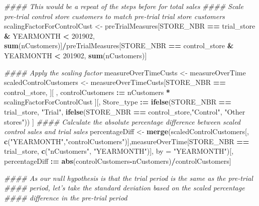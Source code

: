 \documentclass[
]{article}
\newenvironment{Shaded}{\begin{snugshade}}{\end{snugshade}}
\newcommand{\CommentTok}[1]{\textcolor[rgb]{0.56,0.35,0.01}{\textit{#1}}}
\newcommand{\DataTypeTok}[1]{\textcolor[rgb]{0.13,0.29,0.53}{#1}}
\newcommand{\DecValTok}[1]{\textcolor[rgb]{0.00,0.00,0.81}{#1}}
\newcommand{\ErrorTok}[1]{\textcolor[rgb]{0.64,0.00,0.00}{\textbf{#1}}}
\newcommand{\KeywordTok}[1]{\textcolor[rgb]{0.13,0.29,0.53}{\textbf{#1}}}
\newcommand{\NormalTok}[1]{#1}
\newcommand{\OperatorTok}[1]{\textcolor[rgb]{0.81,0.36,0.00}{\textbf{#1}}}
\newcommand{\StringTok}[1]{\textcolor[rgb]{0.31,0.60,0.02}{#1}}
\begin{document}
\begin{Shaded}
\begin{Highlighting}[]
\CommentTok{#### This would be a repeat of the steps before for total sales}
\CommentTok{#### Scale pre-trial control store customers to match pre-trial trial store customers}
\NormalTok{scalingFactorForControlCust <-}\StringTok{ }\NormalTok{preTrialMeasures[STORE_NBR }\OperatorTok{==}\StringTok{ }\NormalTok{trial_store }\OperatorTok{&}
\NormalTok{YEARMONTH }\OperatorTok{<}\StringTok{ }\DecValTok{201902}\NormalTok{, }\KeywordTok{sum}\NormalTok{(nCustomers)]}\OperatorTok{/}\NormalTok{preTrialMeasures[STORE_NBR }\OperatorTok{==}
\NormalTok{control_store }\OperatorTok{&}\StringTok{ }\NormalTok{YEARMONTH }\OperatorTok{<}\StringTok{ }\DecValTok{201902}\NormalTok{, }\KeywordTok{sum}\NormalTok{(nCustomers)]}

\CommentTok{#### Apply the scaling factor}
\NormalTok{measureOverTimeCusts <-}\StringTok{ }\NormalTok{measureOverTime}
\NormalTok{scaledControlCustomers <-}\StringTok{ }\NormalTok{measureOverTimeCusts[STORE_NBR }\OperatorTok{==}\StringTok{ }\NormalTok{control_store,}
\NormalTok{][ , controlCustomers }\OperatorTok{:}\ErrorTok{=}\StringTok{ }\NormalTok{nCustomers }\OperatorTok{*}\StringTok{ }\NormalTok{scalingFactorForControlCust}
\NormalTok{][, Store_type }\OperatorTok{:}\ErrorTok{=}\StringTok{ }\KeywordTok{ifelse}\NormalTok{(STORE_NBR }\OperatorTok{==}\StringTok{ }\NormalTok{trial_store, }\StringTok{"Trial"}\NormalTok{,}
\KeywordTok{ifelse}\NormalTok{(STORE_NBR }\OperatorTok{==}\StringTok{ }\NormalTok{control_store,}\StringTok{"Control"}\NormalTok{, }\StringTok{"Other stores"}\NormalTok{))}
\NormalTok{]}
\CommentTok{#### Calculate the absolute percentage difference between scaled control sales and trial sales}
\NormalTok{percentageDiff <-}\StringTok{ }\KeywordTok{merge}\NormalTok{(scaledControlCustomers[, }\KeywordTok{c}\NormalTok{(}\StringTok{"YEARMONTH"}\NormalTok{,}\StringTok{"controlCustomers"}\NormalTok{)],measureOverTime[STORE_NBR }\OperatorTok{==}\StringTok{ }\NormalTok{trial_store, }\KeywordTok{c}\NormalTok{(}\StringTok{"nCustomers"}\NormalTok{, }\StringTok{"YEARMONTH"}\NormalTok{)],}
\DataTypeTok{by =} \StringTok{"YEARMONTH"}\NormalTok{)[, percentageDiff }\OperatorTok{:}\ErrorTok{=}\StringTok{ }\KeywordTok{abs}\NormalTok{(controlCustomers}\OperatorTok{-}\NormalTok{nCustomers)}\OperatorTok{/}\NormalTok{controlCustomers]}

\CommentTok{#### As our null hypothesis is that the trial period is the same as the pre-trial}
\CommentTok{#### period, let's take the standard deviation based on the scaled percentage #### difference in the pre-trial period}


\end{Highlighting}
\end{Shaded}
\end{document}
